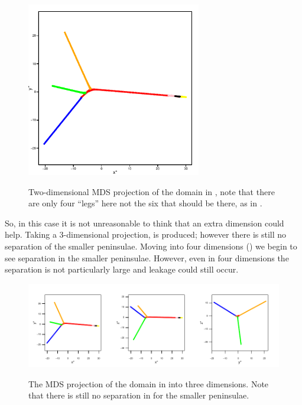 {\begin{figure}
\centering
\includegraphics[width=3in]{mds/figs/comb-2d.pdf} \\
\caption{Two-dimensional MDS projection of the domain in , note that there are only four ``legs'' here not the six that should be there, as in .}
\label{mds-comb-2d}
\end{figure}

So, in this case it is not unreasonable to think that an extra dimension could help. Taking a 3-dimensional projection,  is produced; however there is still no separation of the smaller peninsulae. Moving into four dimensions () we begin to see separation in the smaller peninsulae. However, even in four dimensions the separation is not particularly large and leakage could still occur.

\begin{figure}
\centering
\includegraphics[width=6in]{mds/figs/comb-3d.pdf} \\
\caption{The MDS projection of the domain in  into three dimensions. Note that there is still no separation in for the smaller peninsulae.}
\label{mds-comb-3d}
\end{figure}

}
